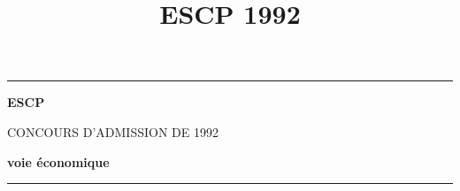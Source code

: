 \documentclass[11pt]{article}%
\title{\bf \vspace{-2cm} ESCP 1992} %
\author{} %
\date{} %
\begin{document}
\maketitle %
\vspace{-1.4cm}\hrule %
\thispagestyle{fancy}

\vspace*{.2cm}


\begin{center}
\textbf{\Large ESCP}

\textsc{\large CONCOURS D'ADMISSION DE 1992}

\textbf{voie économique}


\end{center}

\hrule
\end{document}
